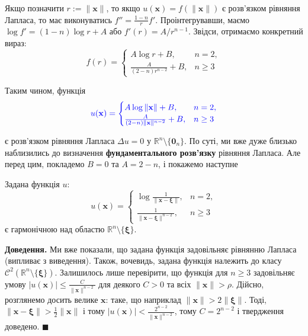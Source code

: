\documentclass{exam_template}
\begin{document}
Якщо позначити $r := \|\mathbf{x}\|$, то якщо $u(\mathbf{x}) =
f(\|\mathbf{x}\|)$ є розв'язком рівняння Лапласа, то має виконуватись $f'' =
\frac{1-n}{r}f'$. Проінтегрувавши, маємо $\log f' = (1-n)\log r + A$ або $f'(r)
= A/r^{n-1}$. Звідси, отримаємо конкретний вираз:
\begin{equation*}
    f(r) = \begin{cases}
        A \log r + B, & n=2, \\
        \frac{A}{(2-n)r^{n-2}} + B, & n \geq 3
    \end{cases}
\end{equation*}

Таким чином, функція
\begin{equation*}
    \textcolor{blue}{u(\mathbf{x}) = \begin{cases}
        A \log \|\mathbf{x}\| + B, & n=2, \\
        \frac{A}{(2-n)\|\mathbf{x}\|^{n-2}} + B, & n \geq 3
    \end{cases}}
\end{equation*}

є розв'язком рівняння Лапласа $\Delta u = 0$ у $\mathbb{R}^n \setminus
\{\mathbf{0}_n\}$. По суті, ми вже дуже близько наблизились до визначення 
\textbf{фундаментального розв'язку} рівняння Лапласа. Але перед цим, 
покладемо $B=0$ та $A=2-n$, і покажемо наступне
\begin{proposition}
    Задана функція $u$:
    \begin{equation*}
        u(\mathbf{x}) = \begin{cases}
            \log \frac{1}{\|\mathbf{x}-\boldsymbol{\xi}\|}, & n=2, \\
            \frac{1}{\|\mathbf{x}-\boldsymbol{\xi}\|^{n-2}}, & n \geq 3
        \end{cases}
    \end{equation*}
    є гармонічною над областю $\mathbb{R}^n \setminus \{\boldsymbol{\xi}\}$.
\end{proposition}

\textbf{Доведення.} Ми вже показали, що задана функція задовільняє рівнянню
Лапласа (випливає з виведення). Також, вочевидь, задана функція належить до
класу $\mathcal{C}^2(\mathbb{R}^n \setminus \{\boldsymbol{\xi}\})$. Залишилось
лише перевірити, що функція для $n \geq 3$ задовільняє умову
$\left|u(\mathbf{x})\right| \leq \frac{C}{\|\mathbf{x}\|^{n-2}}$ для деякого $C
> 0$ та всіх $\|\mathbf{x}\| > \rho$. Дійсно, розглянемо досить велике
$\mathbf{x}$: таке, що наприклад $\|\mathbf{x}\| > 2\|\boldsymbol{\xi}\|$. Тоді,
$\|\mathbf{x}-\boldsymbol{\xi}\| > \frac{1}{2}\|\mathbf{x}\|$ і тому
$|u(\mathbf{x})| < \frac{2^{n-2}}{\|\mathbf{x}\|^{n-2}}$, тому $C = 2^{n-2}$ і 
твердження доведено. \hfill $\blacksquare$
\end{document}
